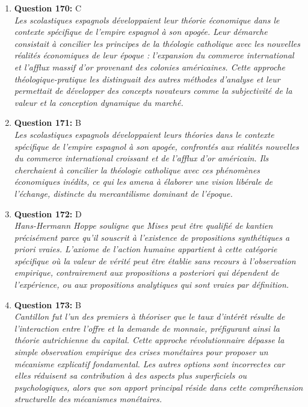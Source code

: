 \documentclass[12pt,a4paper]{article}
\begin{document}
\begin{enumerate}
\item \textbf{Question 170:} C
\\ \textit{Les scolastiques espagnols développaient leur théorie économique dans le contexte spécifique de l'empire espagnol à son apogée. Leur démarche consistait à concilier les principes de la théologie catholique avec les nouvelles réalités économiques de leur époque : l'expansion du commerce international et l'afflux massif d'or provenant des colonies américaines. Cette approche théologique-pratique les distinguait des autres méthodes d'analyse et leur permettait de développer des concepts novateurs comme la subjectivité de la valeur et la conception dynamique du marché.}

\item \textbf{Question 171:} B
\\ \textit{Les scolastiques espagnols développaient leurs théories dans le contexte spécifique de l'empire espagnol à son apogée, confrontés aux réalités nouvelles du commerce international croissant et de l'afflux d'or américain. Ils cherchaient à concilier la théologie catholique avec ces phénomènes économiques inédits, ce qui les amena à élaborer une vision libérale de l'échange, distincte du mercantilisme dominant de l'époque.}

\item \textbf{Question 172:} D
\\ \textit{Hans-Hermann Hoppe souligne que Mises peut être qualifié de kantien précisément parce qu'il souscrit à l'existence de propositions synthétiques a priori vraies. L'axiome de l'action humaine appartient à cette catégorie spécifique où la valeur de vérité peut être établie sans recours à l'observation empirique, contrairement aux propositions a posteriori qui dépendent de l'expérience, ou aux propositions analytiques qui sont vraies par définition.}

\item \textbf{Question 173:} B
\\ \textit{Cantillon fut l'un des premiers à théoriser que le taux d'intérêt résulte de l'interaction entre l'offre et la demande de monnaie, préfigurant ainsi la théorie autrichienne du capital. Cette approche révolutionnaire dépasse la simple observation empirique des crises monétaires pour proposer un mécanisme explicatif fondamental. Les autres options sont incorrectes car elles réduisent sa contribution à des aspects plus superficiels ou psychologiques, alors que son apport principal réside dans cette compréhension structurelle des mécanismes monétaires.}


\end{enumerate}
\end{document}

